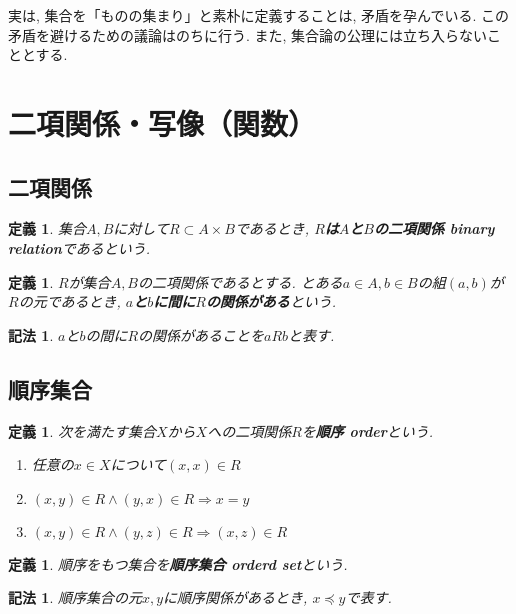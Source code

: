 \documentclass[dvipdfmx]{jsbook}
\theoremstyle{plain}
\newtheorem{Def}[thm]{定義}
\newtheorem{Notation}[thm]{記法}
\begin{document}
実は, 集合を「ものの集まり」と素朴に定義することは, 矛盾を孕んでいる. この矛盾を避けるための議論はのちに行う. 
また, 集合論の公理には立ち入らないこととする.

\section{二項関係・写像（関数）}
\subsection{二項関係}
\begin{Def}
集合$A,B$に対して$R\subset A\times B$であるとき, {\bf $R$は$A$と$B$の二項関係 binary relation}であるという.
\end{Def}
\begin{Def}
$R$が集合$A,B$の二項関係であるとする. 
とある$a\in A, b\in B$の組$(a,b)$が$R$の元であるとき,
{\bf $a$と$b$に間に$R$の関係がある}という.
\end{Def}
\begin{Notation}
$a$と$b$の間に$R$の関係があることを$aRb$と表す.
\end{Notation}
\subsection{順序集合}
\begin{Def}
次を満たす集合$X$から$X$への二項関係$R$を{\bf 順序 order}という.
\begin{enumerate}
\item 任意の$x\in X$について$(x,x)\in R$
\item $(x,y)\in R\land(y,x)\in R\Rightarrow x=y$
\item $(x,y)\in R\land (y,z)\in R
\Rightarrow (x,z)\in R$
\end{enumerate}
\end{Def}
\begin{Def}
順序をもつ集合を{\bf 順序集合 orderd set}という.
\end{Def}
\begin{Notation}
順序集合の元$x,y$に順序関係があるとき, $x\preceq y$で表す.
\end{Notation}
\end{document}
